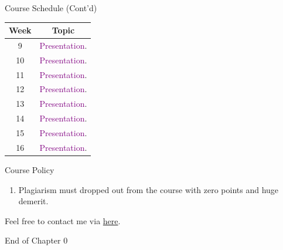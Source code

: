 \documentclass{beamer}
\begin{document}
\begin{frame}{Course Schedule (Cont'd)}
\begin{center}
\begin{tabular}{|c|c|}
\hline
Week & Topic \\
\hline
9 & \textcolor{purple}{Presentation}.\\
\hline
10 & \textcolor{purple}{Presentation}.\\
\hline
11 & \textcolor{purple}{Presentation}.\\
\hline
12 & \textcolor{purple}{Presentation}.\\
\hline
13 & \textcolor{purple}{Presentation}.\\
\hline
14 & \textcolor{purple}{Presentation}.\\
\hline
15 & \textcolor{purple}{Presentation}.\\
\hline
16 & \textcolor{purple}{Presentation}.\\
\hline
\end{tabular}
\end{center}
\end{frame}
\begin{frame}{Course Policy}
\begin{enumerate}
\item Plagiarism must dropped out from the course with zero points and huge demerit. \\
\end{enumerate}
\end{frame}
\begin{frame}{}
\begin{center}
\Large{Feel free to contact me via \href{mailto:politics.tchsiao@gmail.com}{here}.}
\end{center}
\end{frame}
\begin{frame}{}
\begin{center}
\Large{End of Chapter 0}
\end{center}
\end{frame}
\end{document}
